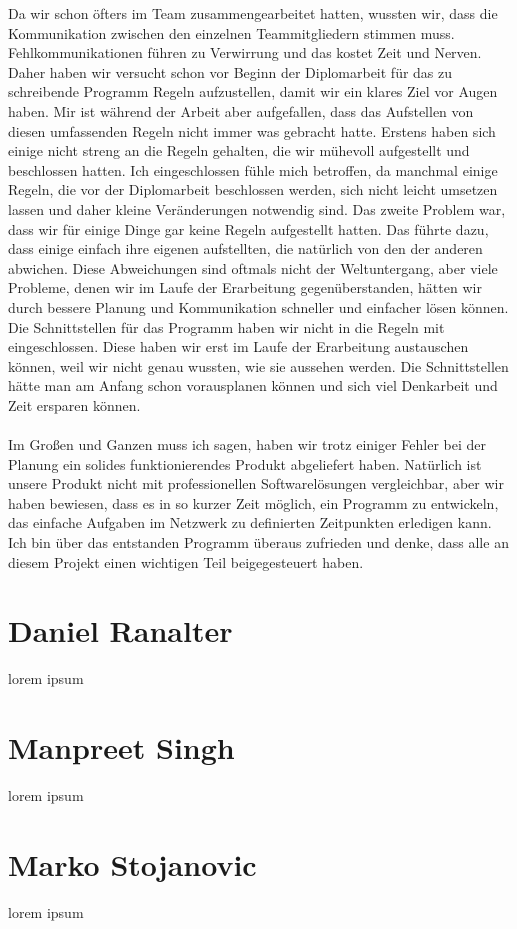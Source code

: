 \documentclass[12pt,a4paper]{report}
\begin{document}
Da wir schon öfters im Team zusammengearbeitet hatten, wussten wir, dass die Kommunikation zwischen den einzelnen Teammitgliedern stimmen muss. Fehlkommunikationen führen zu Verwirrung und das kostet Zeit und Nerven. Daher haben wir versucht schon vor Beginn der Diplomarbeit für das zu schreibende Programm Regeln aufzustellen, damit wir ein klares Ziel vor Augen haben. Mir ist während der Arbeit aber aufgefallen, dass das Aufstellen von diesen umfassenden Regeln nicht immer was gebracht hatte. Erstens haben sich einige nicht streng an die Regeln gehalten, die wir mühevoll aufgestellt und beschlossen hatten. Ich eingeschlossen fühle mich betroffen, da manchmal einige Regeln, die vor der Diplomarbeit beschlossen werden, sich nicht leicht umsetzen lassen und daher kleine Veränderungen notwendig sind. Das zweite Problem war, dass wir für einige Dinge gar keine Regeln aufgestellt hatten. Das führte dazu, dass einige einfach ihre eigenen aufstellten, die natürlich von den der anderen abwichen. Diese Abweichungen sind oftmals nicht der Weltuntergang, aber viele Probleme, denen wir im Laufe der Erarbeitung gegenüberstanden, hätten wir durch bessere Planung und Kommunikation schneller und einfacher lösen können.\\
Die Schnittstellen für das Programm haben wir nicht in die Regeln mit eingeschlossen. Diese haben wir erst im Laufe der Erarbeitung austauschen können, weil wir nicht genau wussten, wie sie aussehen werden. Die Schnittstellen hätte man am Anfang schon vorausplanen können und sich viel Denkarbeit und Zeit ersparen können.\\\\
Im Großen und Ganzen muss ich sagen, haben wir trotz einiger Fehler bei der Planung ein solides funktionierendes Produkt abgeliefert haben. Natürlich ist unsere Produkt nicht mit professionellen Softwarelösungen vergleichbar, aber wir haben bewiesen, dass es in so kurzer Zeit möglich, ein Programm zu entwickeln, das einfache Aufgaben im Netzwerk zu definierten Zeitpunkten erledigen kann. Ich bin über das entstanden Programm überaus zufrieden und denke, dass alle an diesem Projekt einen wichtigen Teil beigegesteuert haben. 

\chapter{Daniel Ranalter}
lorem ipsum
\chapter{Manpreet Singh}
lorem ipsum
\chapter{Marko Stojanovic}
lorem ipsum
\end{document}

